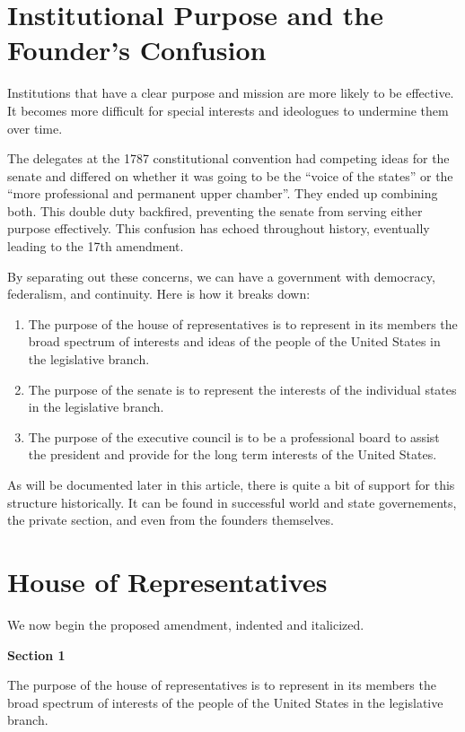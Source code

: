 \documentclass{article}
\begin{document}
\section{Institutional Purpose and the Founder’s Confusion}

Institutions that have a clear purpose and mission are more likely to be effective. It becomes more difficult for special interests and ideologues to undermine them over time.

The delegates at the 1787 constitutional convention had competing ideas for the senate and differed on whether it was going to be the “voice of the states” or the “more professional and permanent upper chamber”. They ended up combining both. This double duty backfired, preventing the senate from serving either purpose effectively. This confusion has echoed throughout history, eventually leading to the 17th amendment.

By separating out these concerns, we can have a government with democracy, federalism, and continuity. Here is how it breaks down:
\begin{enumerate}[I]
\item The purpose of the house of representatives is to represent in its members the broad spectrum of interests and ideas of the people of the United States in the legislative branch.
\item The purpose of the senate is to represent the interests of the individual states in the legislative branch.
\item The purpose of the executive council is to be a professional board to assist the president and provide for the long term interests of the United States.
\end{enumerate}

As will be documented later in this article, there is quite a bit of support for this structure historically. It can be found in successful world and state governements, the private section, and even from the founders themselves.

\section{House of Representatives}

We now begin the proposed amendment, indented and italicized.

\begin{quoting}
\textbf{Section 1}

The purpose of the house of representatives is to represent in its members the broad spectrum of interests of the people of the United States in the legislative branch.
\end{quoting}
\end{document}
